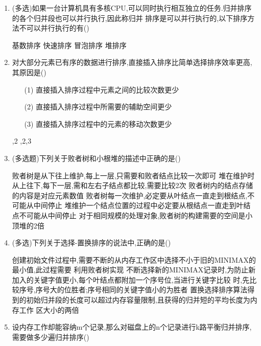 \documentclass[12pt, a4paper, oneside, UTF8]{ctexbook}
\begin{document}
\begin{enumerate}
    \item (多选)如果一台计算机具有多核CPU,可以同时执行相互独立的任务.归并排序的各个归并段也可以并行执行,因此称归并
    排序是可以并行执行的,以下排序方法不可以并行执行的有()
    \begin{choices}
        \task 基数排序 \task 快速排序 \task 冒泡排序 \task 堆排序 
    \end{choices}
    
    \item \bl 对大部分元素已有序的数据进行排序,直接插入排序比简单选择排序效率更高,其原因是()
    \begin{enumerate}
        \item [(1)] 直接插入排序过程中元素之间的比较次数更少
        \item [(2)] 直接插入排序过程中所需要的辅助空间更少
        \item [(3)] 直接插入排序过程中的元素的移动次数更少 
    \end{enumerate} 
    \begin{choices}
          ,2 ,2,3
    \end{choices}

    \item (多选题)下列关于败者树和小根堆的描述中正确的是()
    \begin{choices}[1]
        \task 败者树是从下往上维护,每上一层,只需要和败者结点比较一次即可
        \task 堆在维护时从上往下,每下一层,需和左右子结点都比较,需要比较2次
        \task 败者树内的结点存储的内容是对应元素数值
        \task 败者树每一次维护,必定要从叶结点一直走到根结点,不可能从中间停止 
        \task 堆维护一个结点位置的过程中必定要从根结点一直走到叶结点不可能从中间停止
        \task 对于相同规模的处理对象,败者树的构建需要的空间是小顶堆的2倍
    \end{choices}

    \item (多选)下列关于选择-置换排序的说法中,正确的是() 
    \begin{choices}[1]
        \task 创建初始文件过程中,需要不断的从内存工作区中选择不小于旧的MINIMAX的最小值,此过程需要
        利用败者树实现 
        \task 不断选择新的MINIMAX记录时,为防止新加入的关键字值更小,每个叶结点都附加一个序号位,当进行关键字比较
        时,先比较序号,序号大的位胜者;序号相同的关键字值小的为胜者 
        \task 置换选择排序算法得到的初始归并段的长度可以超过内存容量限制,且获得的归并短的平均长度为内存工作
        区大小的两倍 
    \end{choices}

    \item 设内存工作却能容纳m个记录,那么对磁盘上的n个记录进行k路平衡归并排序,需要做多少遍归并排序() 


\end{enumerate}
\end{document}
